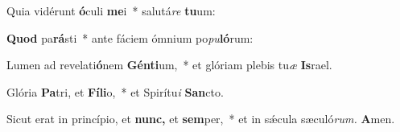 \item Quia vidérunt \textbf{ó}culi \textbf{me}i~* salutá\textit{re} \textbf{tu}um:
\item \textbf{Quod} pa\textbf{rá}sti~* ante fáciem ómnium po\textit{pu}\textbf{ló}rum:
\item Lumen ad revelati\textbf{ó}nem \textbf{Gén}\textbf{ti}um,~* et glóriam plebis tu\textit{æ} \textbf{Is}rael.
\item Glória \textbf{Pa}tri, et \textbf{Fí}\textbf{li}o,~* et Spirítu\textit{i} \textbf{San}cto.
\item Sicut erat in princípio, et \textbf{nunc,} et \textbf{sem}per,~* et in sǽcula sæculó\textit{rum.} \textbf{A}men.
